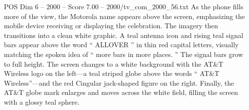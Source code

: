 \begin{textsample}{POS Dim 6 – 2000 – Score 7.00 – 2000/tv\_com\_2000\_56.txt}
As the phone fills more of the view, the Motorola name appears above the screen, emphasizing the mobile device receiving or displaying the celebration.
The imagery then transitions into a clean white graphic.
A teal antenna icon and rising teal signal bars appear above the word “ ALLOVER ” in thin red capital letters, visually matching the spoken idea of “ more bars in more places. ” The signal bars grow to full height.
The screen changes to a white background with the AT\&T Wireless logo on the left—a teal striped globe above the words “ AT\&T Wireless”—and the red Cingular jack-shaped figure on the right.
Finally, the AT\&T globe mark enlarges and moves across the white field, filling the screen with a glossy teal sphere.

\end{textsample}
